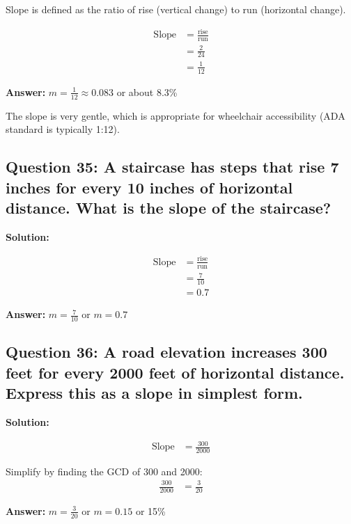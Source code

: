 \documentclass[12pt]{article}
\begin{document}
Slope is defined as the ratio of rise (vertical change) to run (horizontal change).

\begin{align*}
\text{Slope} &= \frac{\text{rise}}{\text{run}} \\
&= \frac{2}{24} \\
&= \frac{1}{12}
\end{align*}

\textbf{Answer: } $m = \frac{1}{12} \approx 0.083$ or about 8.3\%

The slope is very gentle, which is appropriate for wheelchair accessibility (ADA standard is typically 1:12).

\vspace{0.3cm}

\subsection*{Question 35: A staircase has steps that rise 7 inches for every 10 inches of horizontal distance. What is the slope of the staircase?}

\noindent\textbf{Solution:}

\begin{align*}
\text{Slope} &= \frac{\text{rise}}{\text{run}} \\
&= \frac{7}{10} \\
&= 0.7
\end{align*}

\textbf{Answer: } $m = \frac{7}{10}$ or $m = 0.7$

\vspace{0.3cm}

\subsection*{Question 36: A road elevation increases 300 feet for every 2000 feet of horizontal distance. Express this as a slope in simplest form.}

\noindent\textbf{Solution:}

\begin{align*}
\text{Slope} &= \frac{300}{2000}
\end{align*}

Simplify by finding the GCD of 300 and 2000:
\begin{align*}
\frac{300}{2000} &= \frac{3}{20}
\end{align*}

\textbf{Answer: } $m = \frac{3}{20}$ or $m = 0.15$ or 15\%
\end{document}
